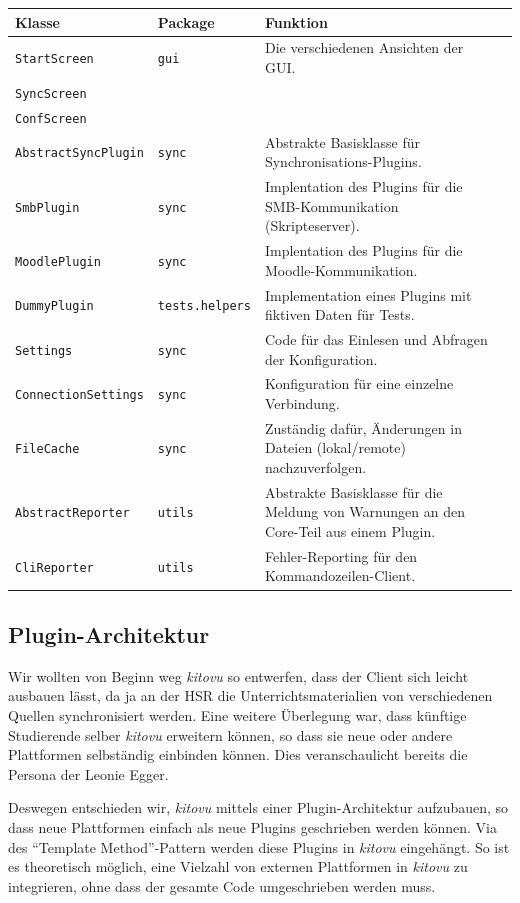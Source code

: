 \documentclass[a4paper]{article}
\begin{document}
\begin{tabulary}{\linewidth}{llLl}
	\toprule
	Klasse & Package & Funktion \\
	\midrule
  \verb|StartScreen| & \verb|gui| & Die verschiedenen Ansichten der GUI. \\
  \verb|SyncScreen| & & \\
  \verb|ConfScreen| & & \\
  \hline
  \verb|AbstractSyncPlugin| & \verb|sync| & Abstrakte Basisklasse für Synchronisations-Plugins. \\
  \verb|SmbPlugin| & \verb|sync| & Implentation des Plugins für die SMB-Kommunikation (Skripteserver). \\
  \verb|MoodlePlugin| & \verb|sync| & Implentation des Plugins für die Moodle-Kommunikation. \\
  \verb|DummyPlugin| & \verb|tests.helpers| & Implementation eines Plugins mit fiktiven Daten für Tests. \\
  \hline
  \verb|Settings| & \verb|sync| & Code für das Einlesen und Abfragen der Konfiguration. \\
  \verb|ConnectionSettings| & \verb|sync| & Konfiguration für eine einzelne Verbindung. \\
  \hline
  \verb|FileCache| & \verb|sync| & Zuständig dafür, Änderungen in Dateien (lokal/remote) nachzuverfolgen. \\
  \hline
  \verb|AbstractReporter| & \verb|utils| & Abstrakte Basisklasse für die Meldung von Warnungen an den Core-Teil aus einem Plugin. \\
  \verb|CliReporter| & \verb|utils| & Fehler-Reporting für den Kommandozeilen-Client. \\
	\bottomrule
\end{tabulary}

\pagebreak

\subsection{Plugin-Architektur}

Wir wollten von Beginn weg \emph{kitovu} so entwerfen, dass der Client sich leicht ausbauen lässt, da ja an der HSR die Unterrichtsmaterialien von verschiedenen Quellen synchronisiert werden. Eine weitere Überlegung war, dass künftige Studierende selber \emph{kitovu} erweitern können, so dass sie neue oder andere Plattformen selbständig einbinden können. Dies veranschaulicht bereits die Persona der Leonie Egger. 

Deswegen entschieden wir, \emph{kitovu} mittels einer Plugin-Architektur aufzubauen, so dass neue Plattformen einfach als neue Plugins geschrieben werden können. Via des ``Template Method''-Pattern werden diese Plugins in \emph{kitovu} eingehängt. So ist es theoretisch möglich, eine Vielzahl von externen Plattformen in \emph{kitovu} zu integrieren, ohne dass der gesamte Code umgeschrieben werden muss.
\end{document}
